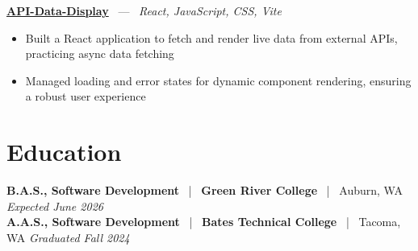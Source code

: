 \documentclass[10pt, letterpaper]{article}
\newcommand{\jobhead}[4]{%
  \vspace{5pt}%
  {\bfseries\color{dark}#1}%
  ~{\color{light}|}~%
  {\bfseries\color{navy}#2}%
  ~{\color{light}|}~%
  {\color{light}#3}%
  \hfill{\color{light}\small\textit{#4}}\\[-2pt]%
}
\newcommand{\projhead}[3]{%
  \vspace{5pt}%
  {\bfseries\color{dark}\href{#2}{#1}}%
  ~{\color{light}---}~%
  {\color{light}\small\textit{#3}}\\[-2pt]%
}
\begin{document}
\projhead{API-Data-Display}{https://github.com/timmyd4/API-Data-Display}{React, JavaScript, CSS, Vite}
\begin{itemize}
  \item Built a React application to fetch and render live data from external APIs, practicing async data fetching
  \item Managed loading and error states for dynamic component rendering, ensuring a robust user experience
\end{itemize}

\section{Education}

\jobhead{B.A.S., Software Development}{Green River College}{Auburn, WA}{Expected June 2026}
\jobhead{A.A.S., Software Development}{Bates Technical College}{Tacoma, WA}{Graduated Fall 2024}
\end{document}
